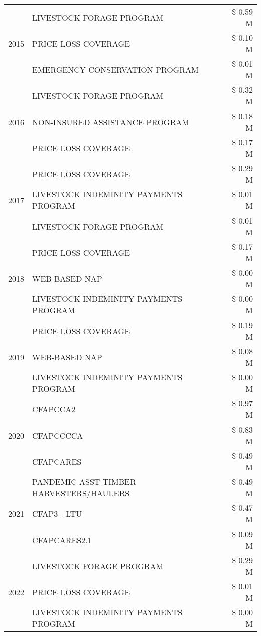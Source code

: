 \begin{tabular}{llr}
\multirow[t]{3}{*}{2015} & LIVESTOCK FORAGE PROGRAM & \$ 0.59 M \\
 & PRICE LOSS COVERAGE & \$ 0.10 M \\
 & EMERGENCY CONSERVATION PROGRAM & \$ 0.01 M \\
\cline{1-3}
\multirow[t]{3}{*}{2016} & LIVESTOCK FORAGE PROGRAM & \$ 0.32 M \\
 & NON-INSURED ASSISTANCE PROGRAM & \$ 0.18 M \\
 & PRICE LOSS COVERAGE & \$ 0.17 M \\
\cline{1-3}
\multirow[t]{3}{*}{2017} & PRICE LOSS COVERAGE & \$ 0.29 M \\
 & LIVESTOCK INDEMINITY PAYMENTS PROGRAM & \$ 0.01 M \\
 & LIVESTOCK FORAGE PROGRAM & \$ 0.01 M \\
\cline{1-3}
\multirow[t]{3}{*}{2018} & PRICE LOSS COVERAGE & \$ 0.17 M \\
 & WEB-BASED NAP & \$ 0.00 M \\
 & LIVESTOCK INDEMINITY PAYMENTS PROGRAM & \$ 0.00 M \\
\cline{1-3}
\multirow[t]{3}{*}{2019} & PRICE LOSS COVERAGE & \$ 0.19 M \\
 & WEB-BASED NAP & \$ 0.08 M \\
 & LIVESTOCK INDEMINITY PAYMENTS PROGRAM & \$ 0.00 M \\
\cline{1-3}
\multirow[t]{3}{*}{2020} & CFAPCCA2 & \$ 0.97 M \\
 & CFAPCCCCA & \$ 0.83 M \\
 & CFAPCARES & \$ 0.49 M \\
\cline{1-3}
\multirow[t]{3}{*}{2021} & PANDEMIC ASST-TIMBER HARVESTERS/HAULERS & \$ 0.49 M \\
 & CFAP3 - LTU & \$ 0.47 M \\
 & CFAPCARES2.1 & \$ 0.09 M \\
\cline{1-3}
\multirow[t]{3}{*}{2022} & LIVESTOCK FORAGE PROGRAM & \$ 0.29 M \\
 & PRICE LOSS COVERAGE & \$ 0.01 M \\
 & LIVESTOCK INDEMINITY PAYMENTS PROGRAM & \$ 0.00 M \\
\cline{1-3}
\bottomrule
\end{tabular}
